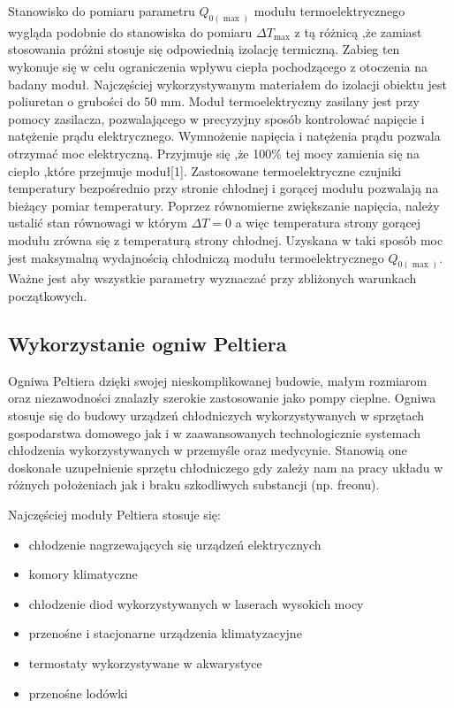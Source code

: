 \documentclass[oneside]{mgr}
\begin{document}
Stanowisko do pomiaru parametru $Q_{0(\max)}$ modułu termoelektrycznego wygląda podobnie do stanowiska do pomiaru $\Delta T_{\max}$ z tą różnicą ,że zamiast stosowania próżni stosuje się odpowiednią izolację termiczną. Zabieg ten wykonuje się w celu ograniczenia wpływu ciepła pochodzącego z otoczenia na badany moduł. Najczęściej wykorzystywanym materiałem do izolacji obiektu jest poliuretan o grubości do 50 mm. Moduł termoelektryczny zasilany jest przy pomocy zasilacza, pozwalającego w precyzyjny sposób kontrolować napięcie i natężenie prądu elektrycznego. Wymnożenie napięcia i natężenia prądu pozwala otrzymać moc elektryczną. Przyjmuje się ,że 100\% tej mocy zamienia się na ciepło ,które przejmuje moduł[1]. Zastosowane termoelektryczne czujniki temperatury bezpośrednio przy stronie chłodnej i gorącej modułu pozwalają na bieżący pomiar temperatury. Poprzez równomierne zwiększanie napięcia, należy ustalić stan równowagi w którym $\Delta T = 0$ a więc temperatura strony gorącej modułu zrówna się z temperaturą strony chłodnej. Uzyskana w taki sposób moc jest maksymalną wydajnością chłodniczą modułu termoelektrycznego $Q_{0(\max)}$. Ważne jest aby wszystkie parametry wyznaczać przy zbliżonych warunkach początkowych.

\subsection{Wykorzystanie ogniw Peltiera}

Ogniwa Peltiera dzięki swojej nieskomplikowanej budowie, małym rozmiarom oraz niezawodności znalazły szerokie zastosowanie jako pompy cieplne. Ogniwa stosuje się do budowy urządzeń chłodniczych wykorzystywanych w sprzętach gospodarstwa domowego jak i w zaawansowanych technologicznie systemach chłodzenia wykorzystywanych w przemyśle oraz medycynie. Stanowią one doskonałe uzupełnienie sprzętu chłodniczego gdy zależy nam na pracy układu w różnych położeniach jak i braku szkodliwych substancji (np. freonu).

Najczęściej moduły Peltiera stosuje się:
\begin{itemize}
    \item chłodzenie nagrzewających się urządzeń elektrycznych
    \item komory klimatyczne
    \item chłodzenie diod wykorzystywanych w laserach wysokich mocy
    \item przenośne i stacjonarne urządzenia klimatyzacyjne
    \item termostaty wykorzystywane w akwarystyce
    \item przenośne lodówki
\end{itemize}
\end{document}
